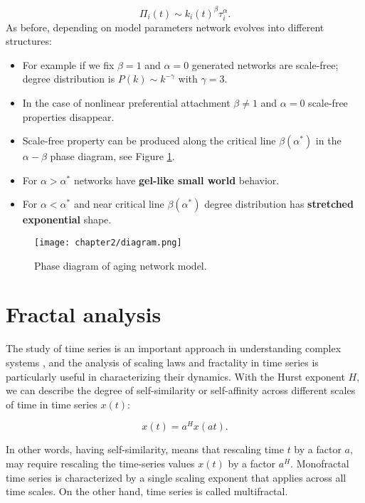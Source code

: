 \begin{equation}
\Pi_{i}(t)\sim k_{i}(t)^{\beta}\tau_{i}^{\alpha}.
\label{eq:1}
\end{equation}
\newpage
As before, depending on model parameters network evolves into different structures:  
\begin{itemize}
	\item For example if we fix $\beta=1$ and $\alpha=0$ generated networks are scale-free; degree distribution is $P(k) \sim k^{-\gamma}$ with $\gamma=3$.
	\item In the case of nonlinear preferential attachment $\beta \neq 1$ and $\alpha=0$ scale-free properties disappear. 
	\item Scale-free property can be produced along the critical line $\beta(\alpha^{*})$ in the $\alpha-\beta$ phase diagram, see Figure \ref{fig:diagram}.
	
	\item For $\alpha>\alpha^{*}$ networks have \textbf{gel-like small world} behavior.
	
	\item For $\alpha<\alpha^{*}$ and near critical line $\beta(\alpha^{*})$ degree distribution has \textbf{stretched exponential} shape.
	
\end{itemize}

\begin{figure}[h]
	\centering
	\texttt{[image: chapter2/diagram.png]}
	\caption[Phase diagram of aging network model.]{Phase diagram of aging network model.}
	\label{fig:diagram}
\end{figure}

\newpage

\section{Fractal analysis}

The study of time series is an important approach in understanding complex systems \cite{kantelhardt2008fractal}, and the analysis of scaling laws and fractality in time series is particularly useful in characterizing their dynamics. With the Hurst exponent $H$, we can describe the degree of self-similarity or self-affinity across different scales of time in time series $x(t)$:

$$x(t) = a^Hx(at).$$

In other words, having self-similarity, means that rescaling time $t$ by a factor $a$, may require rescaling the time-series values $x(t)$ by a factor $a^H$.
Monofractal \cite{fan2012fractal, sidorov2018fractality} time series is characterized by a single scaling exponent that applies across all time scales. On the other hand, time series is called multifractal. 

